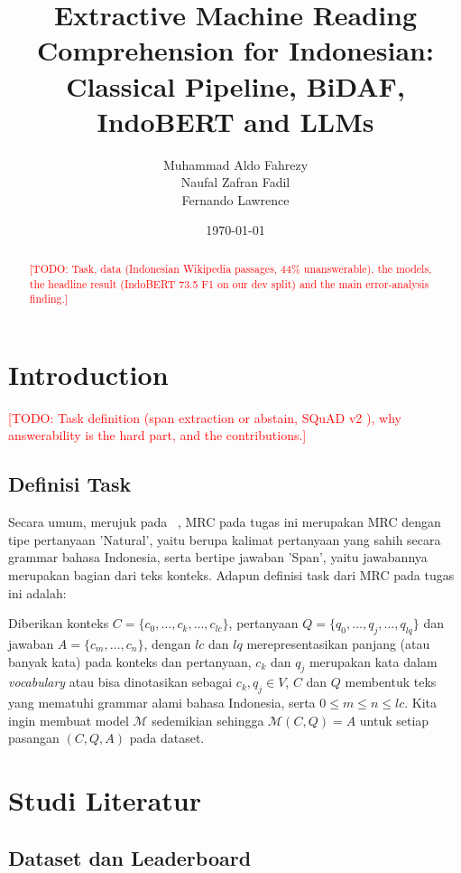 \documentclass[11pt,a4paper]{article}
\title{Extractive Machine Reading Comprehension for Indonesian:\\
Classical Pipeline, BiDAF, IndoBERT and LLMs}
\author{Muhammad Aldo Fahrezy \\
Naufal Zafran Fadil \\
Fernando Lawrence}
\date{\today}
\newcommand{\todo}[1]{\textcolor{red}{[TODO: #1]}}
\begin{document}
\maketitle

\begin{abstract}
\todo{Task, data (Indonesian Wikipedia passages, 44\% unanswerable), the models, the headline result
(IndoBERT 73.5 F1 on our dev split) and the main error-analysis finding.}
\end{abstract}

\section{Introduction}
\todo{Task definition (span extraction or abstain, SQuAD v2 \citep{rajpurkar2018know}), why answerability is the
hard part, and the contributions.}

\subsection{Definisi Task}

Secara umum, merujuk pada ~\cite{Zeng2020}, MRC pada tugas ini merupakan MRC dengan tipe pertanyaan 'Natural', yaitu berupa kalimat pertanyaan yang sahih secara grammar bahasa Indonesia, serta bertipe jawaban 'Span', yaitu jawabannya merupakan bagian dari teks konteks. Adapun definisi task dari MRC pada tugas ini adalah:

Diberikan konteks $C = \{c_0, \dots, c_k, \dots, c_{lc}\}$, pertanyaan $Q = \{q_0, \dots, q_j, \dots, q_{lq}\}$ dan jawaban $A = \{c_m, \dots, c_n\}$, dengan $lc$ dan $lq$ merepresentasikan panjang (atau banyak kata) pada konteks dan pertanyaan, $c_k$ dan $q_j$ merupakan kata dalam \textit{vocabulary} atau bisa dinotasikan sebagai $c_k, q_j \in V$, $C$ dan $Q$ membentuk teks yang mematuhi grammar alami bahasa Indonesia, serta $0 \leq m \leq n \leq lc$. Kita ingin membuat model $\mathcal{M}$ sedemikian sehingga $\mathcal{M}(C, Q) = A$ untuk setiap pasangan $(C, Q, A)$ pada dataset.


\section{Studi Literatur}

\subsection{Dataset dan Leaderboard}
\end{document}
